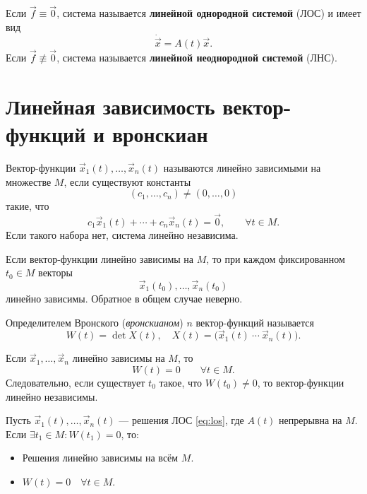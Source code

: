 \documentclass[12pt,a4paper]{article}
\numberwithin{equation}{section}
\newcommand{\vect}[1]{\vec{#1}}
\begin{document}
\begin{definitionHSE}
Если $\vect f\equiv\vect 0$, система называется \textbf{линейной однородной
системой} (ЛОС) и имеет вид
\begin{equation}
 \dot{\vect{x}}=A(t)\vect{x}.
 \label{eq:los}
\end{equation}
Если $\vect f\not\equiv\vect 0$, система называется
\textbf{линейной неоднородной системой} (ЛНС).
\end{definitionHSE}

\section[Линейная зависимость и вронскиан]{Линейная зависимость вектор-функций и вронскиан}

\begin{definitionHSE}
Вектор-функции $\vect{x}_1(t),\ldots,\vect{x}_n(t)$ называются линейно зависимыми на множестве $M$, если существуют константы
\[
(c_1,\ldots,c_n)\neq(0,\ldots,0)
\]
такие, что
\[
c_1\vect{x}_1(t)+\cdots+c_n\vect{x}_n(t)=\vect{0},
\qquad \forall t\in M.
\]
Если такого набора нет, система линейно независима.
\end{definitionHSE}

\begin{lemmaHSE}
Если вектор-функции линейно зависимы на $M$, то при каждом фиксированном $t_0\in M$ векторы
\[
\vect{x}_1(t_0),\ldots,\vect{x}_n(t_0)
\]
линейно зависимы. Обратное в общем случае неверно.
\end{lemmaHSE}

\begin{definitionHSE}
Определителем Вронского (\textit{вронскианом}) $n$ вектор-функций называется
\[
W(t)=\det X(t),
\quad
X(t)=\bigl(\vect{x}_1(t)\ \cdots\ \vect{x}_n(t)\bigr).
\]
\end{definitionHSE}

\begin{corollaryHSE}
Если $\vect{x}_1,\ldots,\vect{x}_n$ линейно зависимы на $M$, то
\[
W(t)=0\qquad \forall t\in M.
\]
Следовательно, если существует $t_0$ такое, что $W(t_0)\neq0$, то вектор-функции линейно независимы.
\end{corollaryHSE}

\begin{lemmaHSE}
Пусть $\vect{x}_1(t),\ldots,\vect{x}_n(t)$ --- решения ЛОС \eqref{eq:los}, где $A(t)$ непрерывна на $M$. Если \(\exists t_1\in M:W(t_1)=0\), то:
\begin{itemize}
\item Решения линейно зависимы на всём $M$.
\item \(W(t)=0\quad\forall t\in M.\)
\end{itemize}
\end{lemmaHSE}
\end{document}
